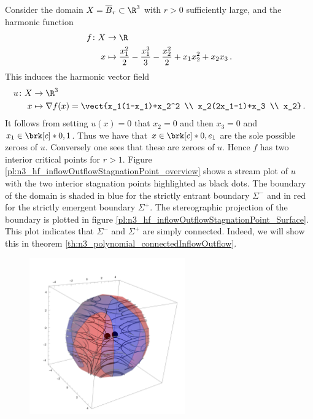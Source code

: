 \begin{example}
  \label{ex:n3_polynomial_defn}
  Consider the domain $X=\overline{B}_r\subset\R^3$ with $r>0$ sufficiently large, and the harmonic function
  \begin{align}
    \begin{aligned}
    f\colon X&\to\R \\
    x&\mapsto \frac{x_1^2}{2}-\frac{x_1^3}{3}-\frac{x_2^2}{2}+x_1x_2^2+x_2x_3\,.
    \end{aligned}
    \label{eq:n3_polynomial_defnf}
  \end{align}
  This induces the harmonic vector field
  \begin{align*}
    u\colon X&\to\R^3 \\
    x&\mapsto\nabla f(x)=\vect{x_1(1-x_1)+x_2^2 \\
      x_2(2x_1-1)+x_3 \\
      x_2}\,.
  \end{align*}
  It follows from setting $u(x)=0$ that $x_2=0$
  and then $x_3=0$ and $x_1\in\brk[c]*{0,1}$. Thus we have that $x\in\brk[c]*{0,e_1}$
  are the sole possible zeroes of $u$. Conversely one sees that these are zeroes of $u$.
  Hence $f$ has two interior critical points for $r>1$.
  Figure \ref{pl:n3_hf_inflowOutflowStagnationPoint_overview}
  shows a stream plot of $u$ with the two interior stagnation points highlighted as black dots.
  The boundary of the domain is shaded in blue for the strictly entrant boundary $\Sigma^-$ and in red 
  for the strictly emergent boundary $\Sigma^+$.
  The stereographic projection of the boundary is plotted in figure \ref{pl:n3_hf_inflowOutflowStagnationPoint_Surface}.
  This plot indicates that $\Sigma^-$ and $\Sigma^+$ are simply connected.
  Indeed, we will show this in theorem \ref{th:n3_polynomial_connectedInflowOutflow}.
  \begin{figure}
    \centering
    \includegraphics[width=0.6\textwidth]{../plots/n3_hf_inflowOutflow_Ball_overview.pdf}

\end{figure}
\end{example}
